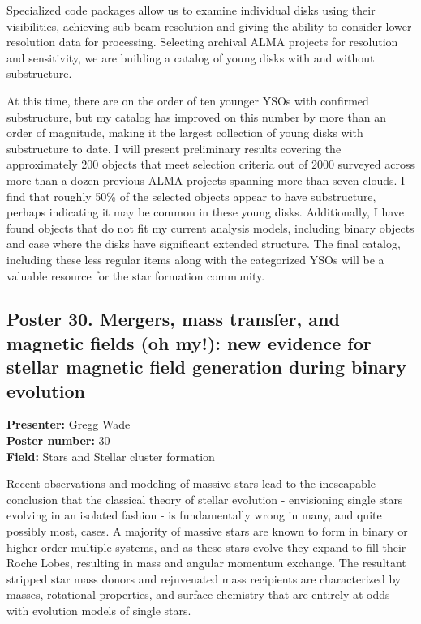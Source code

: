 Specialized code packages allow us to examine individual disks using their visibilities, achieving sub-beam resolution and giving the ability to consider lower resolution data for processing. Selecting archival ALMA projects for resolution and sensitivity, we are building a catalog of young disks with and without substructure.

At this time, there are on the order of ten younger YSOs with confirmed substructure, but my catalog has improved on this number by more than an order of magnitude, making it the largest collection of young disks with substructure to date. I will present preliminary results covering the approximately 200 objects that meet selection criteria out of 2000 surveyed across more than a dozen previous ALMA projects spanning more than seven clouds. I find that roughly 50\% of the selected objects appear to have substructure, perhaps indicating it may be common in these young disks. Additionally, I have found objects that do not fit my current analysis models, including binary objects and case where the disks have significant extended structure. The final catalog, including these less regular items along with the categorized YSOs will be a valuable resource for the star formation community.

\hypertarget{poster-abstract-talk-57}{}\label{poster-abstract-page-talk-57}
\subsection*{Poster 30. Mergers, mass transfer, and magnetic fields (oh my!): new evidence for stellar magnetic field generation during binary evolution}
\textbf{Presenter:} Gregg Wade\\
\textbf{Poster number:} 30\\
\textbf{Field:} Stars and Stellar cluster formation

Recent observations and modeling of massive stars lead to the inescapable conclusion that the classical theory of stellar evolution - envisioning single stars evolving in an isolated fashion - is fundamentally wrong in many, and quite possibly most, cases. A majority of massive stars are known to form in binary or higher-order multiple systems, and as these stars evolve they expand to fill their Roche Lobes, resulting in mass and angular momentum exchange. The resultant stripped star mass donors and rejuvenated mass recipients are characterized by masses, rotational properties, and surface chemistry that are entirely at odds with evolution models of single stars.

